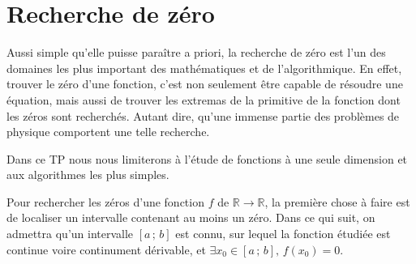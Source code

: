 \section{Recherche de zéro}
Aussi simple qu'elle puisse paraître a priori, la recherche 
de zéro est
l'un des domaines les plus important des mathématiques et de l'algorithmique. 
En effet, trouver le zéro d'une fonction, c'est non seulement 
être capable de résoudre une équation, mais aussi de trouver 
les extremas de la primitive de la fonction dont les zéros sont recherchés. 
Autant dire, qu'une immense partie des problèmes de physique comportent 
une telle recherche.

Dans ce TP nous nous limiterons à l'étude de fonctions à une seule dimension et aux algorithmes les plus simples. 

Pour rechercher les zéros d'une 
fonction $f$ de $\mathbb{R}  \longrightarrow  \mathbb{R}$, 
la première chose à faire est  de localiser un intervalle contenant 
au moins un zéro. Dans ce qui suit, on admettra qu'un intervalle $[a\,;\,b]$
est connu, sur lequel la fonction étudiée est continue voire continument dérivable, et $\exists x_0 \in  [a\,;\,b], \, f(x_0)=0$.

